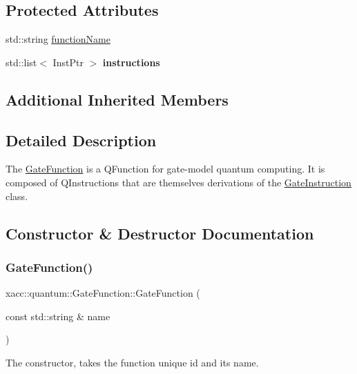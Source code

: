 \subsection*{Protected Attributes}
\begin{DoxyCompactItemize}
\item 
std\+::string \hyperlink{a01272_aea17cb1ca610bb5b8eadb0642c32b937}{function\+Name}
\item 
\mbox{\label{a01272_aa2334b23541206ed02023ec28f5e4ac7}} 
std\+::list$<$ Inst\+Ptr $>$ {\bfseries instructions}
\end{DoxyCompactItemize}
\subsection*{Additional Inherited Members}


\subsection{Detailed Description}
The \hyperlink{a01272}{Gate\+Function} is a Q\+Function for gate-\/model quantum computing. It is composed of Q\+Instructions that are themselves derivations of the \hyperlink{a01276}{Gate\+Instruction} class. 

\subsection{Constructor \& Destructor Documentation}
\mbox{\label{a01272_a77545e72bd53268f609888654fcd8eee}} 
\subsubsection{\texorpdfstring{Gate\+Function()}{GateFunction()}}
{\footnotesize\ttfamily xacc\+::quantum\+::\+Gate\+Function\+::\+Gate\+Function (\begin{DoxyParamCaption}\item[{const std\+::string \&}]{name }\end{DoxyParamCaption})\hspace{0.3cm}{\ttfamily [inline]}}

The constructor, takes the function unique id and its name.



